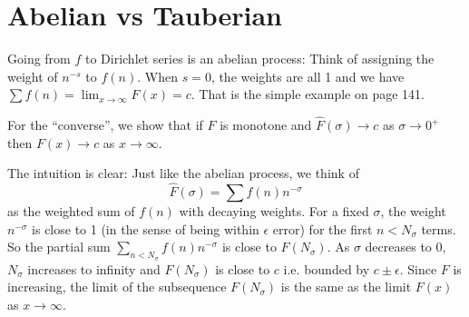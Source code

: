 \documentclass[12pt]{article}
\newcommand{\Fhat}{\widehat{F}}
\begin{document}
\fi

\section{Abelian vs Tauberian}

Going from $f$ to Dirichlet series is an abelian process: Think of assigning the weight of $n^{-s}$ to $f(n)$. When $s = 0$, the weights are all 1 and we have $\sum f(n) = \lim_{x \rightarrow \infty} F(x) = c$. That is the simple example on page 141.

For the ``converse'', we show that if $F$ is monotone and $\Fhat(\sigma) \rightarrow c$ as $\sigma \rightarrow 0^+$ then $F(x) \rightarrow c$ as $x \rightarrow \infty$.

The intuition is clear: Just like the abelian process, we think of
$$\Fhat(\sigma) = \sum f(n) n^{-\sigma}$$
as the weighted sum of $f(n)$ with decaying weights. For a fixed $\sigma$, the weight $n^{-\sigma}$ is close to 1 (in the sense of being within $\epsilon$ error) for the first $n < N_\sigma$ terms. So the partial sum $\sum_{n < N_\sigma} f(n) n^{-\sigma}$ is close to $F(N_\sigma)$. As $\sigma$ decreases to 0, $N_\sigma$ increases to infinity and $F(N_\sigma)$ is close to $c$ i.e. bounded by $c \pm \epsilon$. Since $F$ is increasing, the limit of the subsequence $F(N_\sigma)$ is the same as the limit $F(x)$ as $x \rightarrow \infty$.
\end{document}
